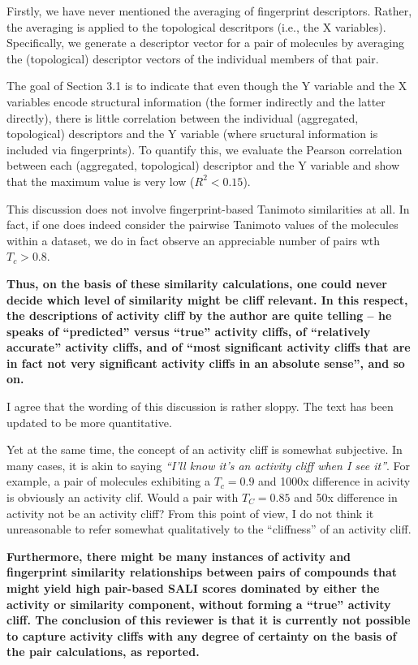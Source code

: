 \documentclass[letterpaper, 12pt]{article}
\begin{document}
Firstly, we have never mentioned the averaging of fingerprint descriptors. Rather, the averaging is
applied to the topological descritpors (i.e., the X variables). Specifically, we generate a
descriptor vector for a pair of molecules by averaging the (topological) descriptor vectors of the
individual members of that pair.

The goal of Section 3.1 is to indicate that even though the Y variable and the X variables encode
structural information (the former indirectly and the latter directly), there is little correlation
between the individual (aggregated, topological) descriptors and the Y variable (where sructural
information is included via fingerprints). To quantify this, we evaluate the Pearson correlation
between each (aggregated, topological) descriptor and the Y variable and show that the maximum value
is very low ($R^2 < 0.15$).

This discussion does not involve fingerprint-based Tanimoto similarities at all. In fact, if one
does indeed consider the pairwise Tanimoto values of the molecules within a dataset, we do in fact
observe an appreciable number of pairs wth $T_c > 0.8$.


\textbf{Thus, on the basis of these similarity calculations, one could never decide which level of
  similarity might be cliff relevant. In this respect, the descriptions of activity cliff by the
  author are quite telling – he speaks of “predicted” versus “true” activity cliffs, of “relatively
  accurate” activity cliffs, and of “most significant activity cliffs that are in fact not very
  significant activity cliffs in an absolute sense”, and so on. }

I agree that the wording of this discussion is rather sloppy. The text has been updated to be more
quantitative.

Yet at the same time, the concept of an activity cliff is somewhat subjective. In many cases, it is
akin to saying \emph{``I'll know it's an activity cliff when I see it''}. For example, a pair of
molecules exhibiting a $T_c = 0.9$ and 1000x difference in acivity is obviously an activity
clif. Would a pair with $T_C = 0.85$ and 50x difference in activity not be an activity cliff? From
this point of view, I do not think it unreasonable to refer somewhat qualitatively to the
``cliffness'' of an activity cliff.

\textbf{Furthermore, there might be many instances of activity and fingerprint similarity
  relationships between pairs of compounds that might yield high pair-based SALI scores dominated by
  either the activity or similarity component, without forming a “true” activity cliff. The
  conclusion of this reviewer is that it is currently not possible to capture activity cliffs with
  any degree of certainty on the basis of the pair calculations, as reported.}
\end{document}
